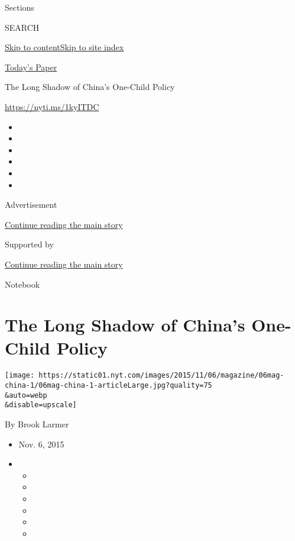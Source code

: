 Sections

SEARCH

\protect\hyperlink{site-content}{Skip to
content}\protect\hyperlink{site-index}{Skip to site index}

\href{https://myaccount.nytimes.com/auth/login?response_type=cookie\&client_id=vi}{}

\href{https://www.nytimes.com/section/todayspaper}{Today's Paper}

The Long Shadow of China's One-Child Policy

\url{https://nyti.ms/1kyITDC}

\begin{itemize}
\item
\item
\item
\item
\item
\item
\end{itemize}

Advertisement

\protect\hyperlink{after-top}{Continue reading the main story}

Supported by

\protect\hyperlink{after-sponsor}{Continue reading the main story}

Notebook

\hypertarget{the-long-shadow-of-chinas-one-child-policy}{%
\section{The Long Shadow of China's One-Child
Policy}\label{the-long-shadow-of-chinas-one-child-policy}}

\texttt{[image: https://static01.nyt.com/images/2015/11/06/magazine/06mag-china-1/06mag-china-1-articleLarge.jpg?quality=75\\\&auto=webp\\\&disable=upscale]}

By Brook Larmer

\begin{itemize}
\item
  Nov. 6, 2015
\item
  \begin{itemize}
  \item
  \item
  \item
  \item
  \item
  \item
  \end{itemize}
\end{itemize}

